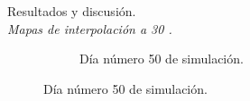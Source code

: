 \begin{frame}[t]{Resultados y discusión.\\\textit{Mapas de interpolación a 30 \textcelsius.}}
\begin{figure}
\begin{subfigure}[b]{0.45\textwidth}
        \caption{Día número 50 de simulación.}
    \end{subfigure}
    \end{figure}
\end{frame}

